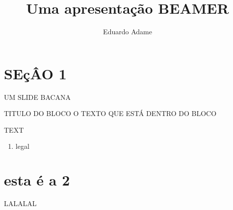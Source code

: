 \documentclass[11pt]{beamer}
\author{Eduardo Adame}
\title{Uma apresentação BEAMER}
\begin{document}
\begin{frame}
\titlepage
\end{frame}

\begin{frame}
\tableofcontents
\end{frame}

\section{SEçÂO 1 }

\begin{frame}{UM SLIDE BACANA}
\begin{block}{TITULO DO BLOCO}
O TEXTO QUE ESTÁ DENTRO DO BLOCO
\end{block}
TEXT
\begin{enumerate}
\item legal
\end{enumerate}
\end{frame}

\section{esta é a 2}

\begin{frame}
LALALAL
\end{frame}
\end{document}
